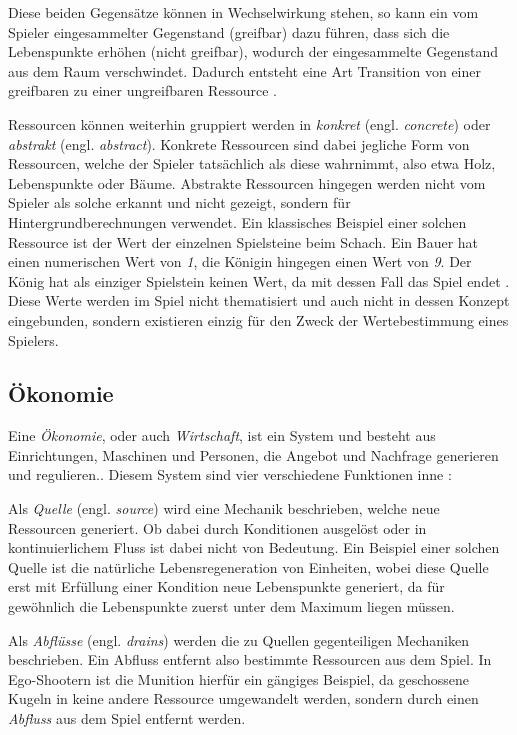 Diese beiden Gegensätze können in Wechselwirkung stehen, so kann ein vom Spieler eingesammelter Gegenstand (greifbar) dazu führen, dass sich die Lebenspunkte erhöhen (nicht greifbar), wodurch der eingesammelte Gegenstand aus dem Raum verschwindet. Dadurch entsteht eine Art Transition von einer greifbaren zu einer ungreifbaren Ressource \cite*[]{book:gamedesign:resources}. 

Ressourcen können weiterhin gruppiert werden in \textit{konkret} (engl. \textit{concrete}) oder \textit{abstrakt} (engl. \textit{abstract}). Konkrete Ressourcen sind dabei jegliche Form von Ressourcen, welche der Spieler tatsächlich als diese wahrnimmt, also etwa Holz, Lebenspunkte oder Bäume. Abstrakte Ressourcen hingegen werden nicht vom Spieler als solche erkannt und nicht gezeigt, sondern für Hintergrundberechnungen verwendet. Ein klassisches Beispiel einer solchen Ressource ist der Wert der einzelnen Spielsteine beim Schach. Ein Bauer hat einen numerischen Wert von \textit{1}, die Königin hingegen einen Wert von \textit{9}. Der König hat als einziger Spielstein keinen Wert, da mit dessen Fall das Spiel endet \cite*[]{chesspieces}. Diese Werte werden im Spiel nicht thematisiert und auch nicht in dessen Konzept eingebunden, sondern existieren einzig für den Zweck der Wertebestimmung eines Spielers.

\subsection{Ökonomie}
Eine \textit{Ökonomie}, oder auch \textit{Wirtschaft}, ist ein System und \glqq [...] besteht aus Einrichtungen, Maschinen und Personen, die Angebot und Nachfrage generieren und regulieren.\grqq \cite*[]{definition:economy}. Diesem System sind vier verschiedene Funktionen inne \cite*[]{book:gamedesign:economy,article:medium:economy}:

Als \textit{Quelle} (engl. \textit{source}) wird eine Mechanik beschrieben, welche neue Ressourcen generiert. Ob dabei durch Konditionen ausgelöst oder in kontinuierlichem Fluss ist dabei nicht von Bedeutung. Ein Beispiel einer solchen Quelle ist die natürliche Lebensregeneration von Einheiten, wobei diese Quelle erst mit Erfüllung einer Kondition neue Lebenspunkte generiert, da für gewöhnlich die Lebenspunkte zuerst unter dem Maximum liegen müssen.

Als \textit{Abflüsse} (engl. \textit{drains}) werden die zu Quellen gegenteiligen Mechaniken beschrieben. Ein Abfluss entfernt also bestimmte Ressourcen aus dem Spiel. In Ego-Shootern ist die Munition hierfür ein gängiges Beispiel, da geschossene Kugeln in keine andere Ressource umgewandelt werden, sondern durch einen \textit{Abfluss} aus dem Spiel entfernt werden.

